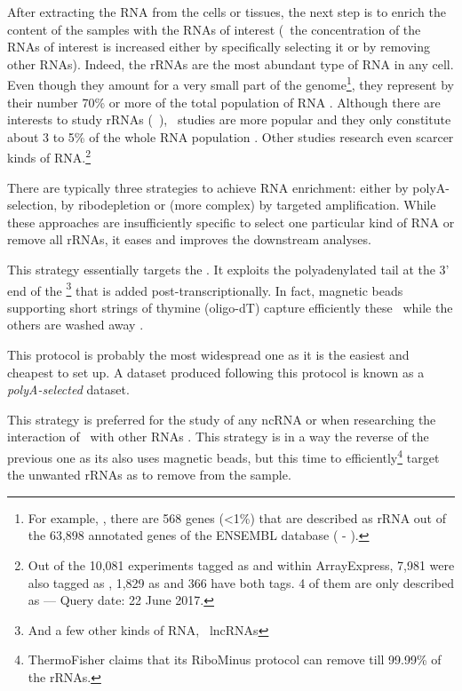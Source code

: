 
After extracting the \gls{RNA} from the cells or tissues,
the next step is to enrich the content of the samples with the \glspl{RNA}
of interest (\ie\ the concentration of the \glspl{RNA} of interest is increased
either by specifically selecting it or by removing other \glspl{RNA}). Indeed,
the \glspl{rRNA} are the most abundant type of \gls{RNA} in any cell. Even
though they amount for a very small part of the genome\footnote{For example,
, there are 568 genes (<1\%) that are described as
\gls{rRNA} out of the 63,898 annotated genes of the ENSEMBL database
( - ).}, they represent by their number 70\% or more of
the total population of \gls{RNA} .
Although there are interests to study \glspl{rRNA} (\eg\ ),
\mRNAs\ studies are more
popular and they only constitute about 3 to 5\% of the whole \gls{RNA} population
. Other studies research even scarcer kinds of
\gls{RNA}.\footnote{Out of the 10,081 experiments tagged as 
and  within \gls{ArrayExpress}, 7,981 were also
tagged as , 1,829 as  and 366 have both tags. 4 of them are only described as
 --- Query date: 22
June 2017.}

There are typically three strategies to achieve \gls{RNA} enrichment:
either by polyA-selection, by ribodepletion or (more complex)
by targeted amplification. While these
approaches are insufficiently specific to select one particular kind of \gls{RNA}
or remove all \glspl{rRNA}, it eases and improves the downstream analyses.

This strategy essentially targets the \mRNAs. It exploits the polyadenylated
tail at the 3' end of the \mRNAs\footnote{And a few other kinds of \gls{RNA},
\eg\ \glspl{lncRNA} } that is added
post-transcriptionally. In fact, magnetic beads supporting short
strings of thymine (oligo-dT) capture efficiently these \mRNAs\ while the others
are washed away .

This protocol is probably the most widespread one as it is the easiest and
cheapest to set up. A dataset produced following this protocol is known as
a \emph{polyA-selected} dataset.

This strategy is preferred for the study of any \gls{ncRNA} or when researching
the interaction of \mRNAs\ with other \glspl{RNA} . This
strategy is in a way the reverse of the previous one as its also
uses magnetic beads, but this time to efficiently\footnote{ThermoFisher claims
that its RiboMinus protocol can remove till 99.99\% of the \glspl{rRNA}.}
target the unwanted \glspl{rRNA} as to remove from the sample.

